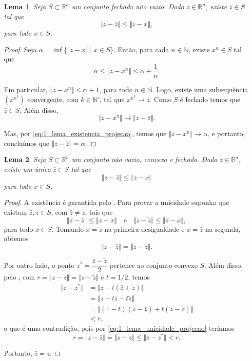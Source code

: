 \documentclass[12pt,a4paper]{scrartcl}
\def\RR{\mathds{R}}
\newtheorem{lema}{Lema}
\theoremstyle{definition}%
\begin{document}
\begin{lema} \label{lema:existencia_projecao}
Seja $S \subset \RR^{n}$ um conjunto fechado não vazio. Dado $z \in \RR^{n}$, existe $\bar{z} \in S$ tal que
\[
\Vert z - \bar{z} \Vert \leq \Vert z - x \Vert,
\]
para todo $x \in S$.
\end{lema}
\begin{proof}
Seja $\alpha = \inf \{\Vert z-x \Vert \mid x \in S\}$. Então, para cada $n \in \mathds{N}$, existe $x^{n} \in S$ tal que
\[ \label{eq:1_lema_existencia_projecao}
\alpha \leq \Vert z-x^{n} \Vert \leq \alpha + \dfrac{1}{n}. 
\]

Em particular, $\Vert z-x^{n} \Vert \leq \alpha + 1$, para todo $n \in \mathds{N}$. Logo, existe uma subsequência $(x^{n^{k}})$ convergente, com $k \in \mathds{N}'$, tal que $x^{n^{k}} \longrightarrow \bar{z}$. Como $S$ é fechado temos que $\bar{z} \in S$. Além disso, 
\[
\Vert z-x^{n} \Vert \longrightarrow \Vert z-\bar{z} \Vert .
\]

Mas, por \eqref{eq:1_lema_existencia_projecao}, temos que $\Vert z-x^{n} \Vert \longrightarrow \alpha $, e portanto, concluímos que $\Vert z-\bar{z} \Vert = \alpha$.

\end{proof}


\begin{lema}  \label{lema:unicidadeprojecao_convexidade}
Seja $S \subset \RR^{n}$ um conjunto não vazio, convexo e fechado. Dado $z \in \RR^{n}$, existe um único $\bar{z} \in S$ tal que
\[
\Vert z - \bar{z} \Vert \leq \Vert z - x \Vert
\]
para todo $x \in S$.
\end{lema}
\begin{proof}
A existência é garantida pelo . Para provar a unicidade suponha que existam $\bar{z}, \tilde{z} \in S$, com $\bar{z} \neq \tilde{z}$, ta{}is que
\[ \label{eq:1_lema_unicidade_projecao}
\Vert z-\bar{z} \Vert \leq \Vert z-x \Vert \quad \text{e} \quad \Vert z-\tilde{z} \Vert \leq \Vert z-x \Vert ,
\]
para todo $x \in S$. Tomando $x=\tilde{z}$ na primeira desigualdade e $x=\bar{z}$ na segunda, obtemos
\[
\Vert z-\bar{z} \Vert = \Vert z-\tilde{z} \Vert .
\]

Por outro lado, o ponto $z^{*} = \dfrac{\bar{z} - \tilde{z}}{2}$ pertence ao conjunto convexo $S$. Além disso, pelo , com $r= \Vert z-\bar{z} \Vert = \Vert z - \tilde{z} \Vert$ e $t=1/2$, temos
\begin{align}
\Vert z-z^{*} \Vert &=  \Vert z-t(\bar{z}+\tilde{z}) \Vert \\
& = \Vert z - t\bar{z} - t\tilde{z} \Vert \\
& = \Vert (1-t)(z-\bar{z}) + t(z-\tilde{z}) \Vert \\
& < r ,
\end{align}
o que é uma contradição, pois por \eqref{eq:1_lema_unicidade_projecao} teríamos
\[
r = \Vert z-\bar{z} \Vert = \Vert z - \tilde{z} \Vert \leq \Vert z-z^{*} \Vert < r .
\]

Portanto, $\bar{z} = \tilde{z}$.


\end{proof}
\end{document}
